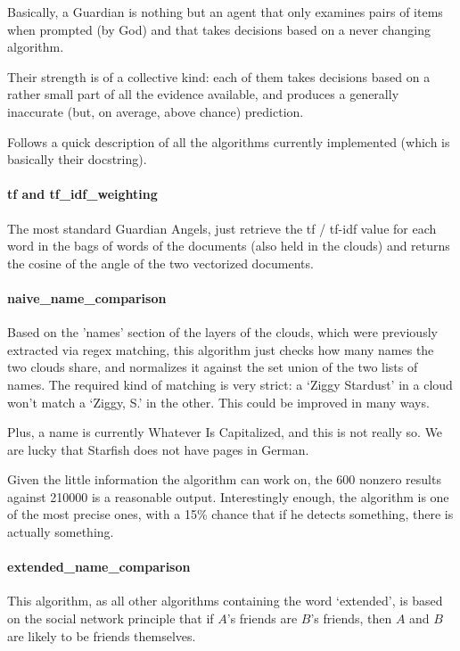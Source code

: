 \documentclass[11pt]{article}
\begin{document}
Basically, a Guardian is nothing but an agent that only examines pairs of items when prompted (by God) and that takes decisions based on a never changing algorithm.

Their strength is of a collective kind: each of them takes decisions based on a rather small part of all the evidence available, and produces a generally inaccurate (but, on average, above chance) prediction.

Follows a quick description of all the algorithms currently implemented (which is basically their docstring).


\paragraph{tf and tf\_idf\_weighting}

The most standard Guardian Angels, just retrieve the tf / tf-idf value for each word in the bags of words of the documents (also held in the clouds) and returns the cosine of the angle of the two vectorized documents.

\paragraph{naive\_name\_comparison}

Based on the 'names' section of the layers of the clouds, which were previously extracted via regex matching, this algorithm just checks how many names the two clouds share, and normalizes it against the set union of the two lists of names.
The required kind of matching is very strict: a `Ziggy Stardust' in a cloud won't match a `Ziggy, S.' in the other. This could be improved in many ways.

Plus, a name is currently Whatever Is Capitalized, and this is not really so. We are lucky that Starfish does not have pages in German.

Given the little information the algorithm can work on, the 600 nonzero results against 210000 is a reasonable output. Interestingly enough, the algorithm is one of the most precise ones, with a 15\% chance that if he detects something, there is actually something.

\paragraph{extended\_name\_comparison}

This algorithm, as all other algorithms containing the word `extended', is based on the social network principle that if $A$'s friends are $B$'s friends, then $A$ and $B$ are likely to be friends themselves.
\end{document}
